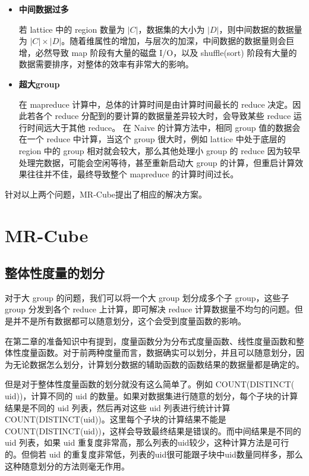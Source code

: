 \begin{itemize}

\item \textbf{中间数据过多}

若 lattice 中的 region 数量为 $|C|$，数据集的大小为 $|D|$，则中间数据的数据量为 $|C|\times |D|$。随着维属性的增加，与层次的加深，中间数据的数据量则会巨增，必然导致 map 阶段有大量的磁盘 I/O，以及 shuffle(sort) 阶段有大量的数据需要排序，对整体的效率有非常大的影响。

\item \textbf{超大group}

在 mapreduce 计算中，总体的计算时间是由计算时间最长的 reduce 决定。因此若各个 reduce 分配到的要计算的数据量差异较大时，会导致某些 reduce 运行时间远大于其他 reduce。 在 Naive 的计算方法中，相同 group 值的数据会在一个 reduce 中计算，当这个 group 很大时，例如 lattice 中处于底层的 region 中的 group 相对就会较大，那么其他处理小 group 的 reduce 因为较早处理完数据，可能会空闲等待，甚至重新启动大 group 的计算，但重启计算效果往往并不佳，最终导致整个 mapreduce 的计算时间过长。

\end{itemize}

针对以上两个问题，MR-Cube提出了相应的解决方案。

\section{MR-Cube}

\subsection{整体性度量的划分}

对于大 group 的问题，我们可以将一个大 group 划分成多个子 group，这些子 group 分发到各个 reduce 上计算，即可解决 reduce 计算数据量不均匀的问题。但是并不是所有数据都可以随意划分，这个会受到度量函数的影响。

在第二章的准备知识中有提到，度量函数分为分布式度量函数、线性度量函数和整体性度量函数。对于前两种度量而言，数据确实可以划分，并且可以随意划分，因为无论数据怎么划分，计算划分数据的辅助函数的函数结果的数据量都是确定的。

但是对于整体性度量函数的划分就没有这么简单了。例如 COUNT(DISTINCT( uid))，计算不同的 uid 的数量。如果对数据集进行随意的划分，每个子块的计算结果是不同的 uid 列表，然后再对这些 uid 列表进行统计计算 COUNT(DISTINCT(uid))。这里每个子块的计算结果不能是COUNT(DISTINCT(uid))，这样会导致最终结果是错误的。而中间结果是不同的 uid 列表，如果 uid 重复度非常高，那么列表的uid较少，这种计算方法是可行的。但倘若 uid 的重复度非常低，列表的uid很可能跟子块中uid数量同样多，那么这种随意划分的方法则毫无作用。 

